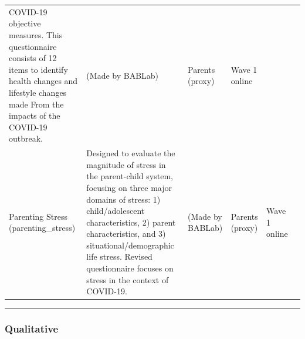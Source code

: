 \documentclass[]{book}
\begin{document}
\begin{longtable}[]{@{}llllll@{}}
\begin{minipage}[t]{0.18\columnwidth}
COVID-19 objective measures. This questionnaire consists of 12 items to identify health changes and lifestyle changes made From the impacts of the COVID-19 outbreak.\strut
\end{minipage} & \begin{minipage}[t]{0.15\columnwidth}\raggedright
(Made by BABLab)\strut
\end{minipage} & \begin{minipage}[t]{0.16\columnwidth}\raggedright
Parents (proxy)\strut
\end{minipage} & \begin{minipage}[t]{0.06\columnwidth}\raggedright
Wave 1 online\strut
\end{minipage} & \begin{minipage}[t]{0.10\columnwidth}\raggedright
\strut
\end{minipage}\tabularnewline
\begin{minipage}[t]{0.18\columnwidth}\raggedright
Parenting Stress (parenting\_stress)\strut
\end{minipage} & \begin{minipage}[t]{0.18\columnwidth}\raggedright
Designed to evaluate the magnitude of stress in the parent-child system, focusing on three major domains of stress: 1) child/adolescent characteristics, 2) parent characteristics, and 3) situational/demographic life stress. Revised questionnaire focuses on stress in the context of COVID-19.\strut
\end{minipage} & \begin{minipage}[t]{0.15\columnwidth}\raggedright
(Made by BABLab)\strut
\end{minipage} & \begin{minipage}[t]{0.16\columnwidth}\raggedright
Parents (proxy)\strut
\end{minipage} & \begin{minipage}[t]{0.06\columnwidth}\raggedright
Wave 1 online\strut
\end{minipage} & \begin{minipage}[t]{0.10\columnwidth}\raggedright
\strut
\end{minipage}\tabularnewline
\bottomrule
\end{longtable}

\begin{center}\rule{0.5\linewidth}{0.5pt}\end{center}

\hypertarget{qualitative}{%
\subsubsection{Qualitative}\label{qualitative}}
\end{document}
